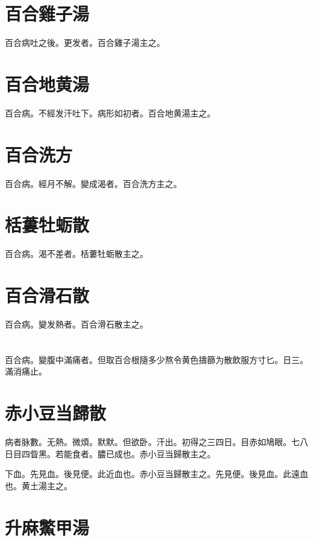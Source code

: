\section{百合雞子湯}

百合病吐之後。更发者。百合雞子湯主之。

\section{百合地黄湯}

百合病。不經发汗吐下。病形如初者。百合地黄湯主之。

\section{百合洗方}

百合病。經月不解。變成渴者。百合洗方主之。

\section{栝蔞牡蛎散}

百合病。渴不差者。栝蔞牡蛎散主之。

\section{百合滑石散}

百合病。變发熱者。百合滑石散主之。

\section{}

百合病。變腹中滿痛者。但取百合根隨多少熬令黄色擣篩为散飲服方寸匕。日三。滿消痛止。

\section{赤小豆当歸散}

病者脉數。无熱。微煩。默默。但欲卧。汗出。初得之三四日。目赤如鳩眼。七八日目四眥黑。若能食者。膿已成也。赤{\khaaitp 小}豆当歸散主之。

下血。先見血。後見便。此近血也。赤小豆当歸散主之。先見便。後見血。此遠血也。黄土湯主之。

\section{升麻鱉甲湯}


